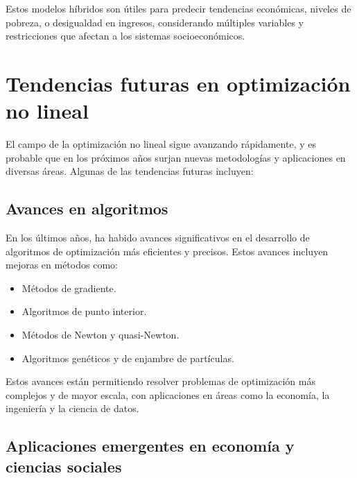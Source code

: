 \begin{flushleft}
	Estos modelos híbridos son útiles para predecir tendencias económicas, niveles de pobreza, o desigualdad en ingresos, considerando múltiples variables y restricciones que afectan a los sistemas socioeconómicos.
\end{flushleft}

\section{Tendencias futuras en optimización no lineal}

\begin{flushleft}
	El campo de la optimización no lineal sigue avanzando rápidamente, y es probable que en los próximos años surjan nuevas metodologías y aplicaciones en diversas áreas. Algunas de las tendencias futuras incluyen:
\end{flushleft}

\subsection{Avances en algoritmos}

\begin{flushleft}
	En los últimos años, ha habido avances significativos en el desarrollo de algoritmos de optimización más eficientes y precisos. Estos avances incluyen mejoras en métodos como:
\end{flushleft}

\begin{itemize}
	\item Métodos de gradiente.
	\item Algoritmos de punto interior.
	\item Métodos de Newton y quasi-Newton.
	\item Algoritmos genéticos y de enjambre de partículas.
\end{itemize}

\begin{flushleft}
	Estos avances están permitiendo resolver problemas de optimización más complejos y de mayor escala, con aplicaciones en áreas como la economía, la ingeniería y la ciencia de datos.
\end{flushleft}

\subsection{Aplicaciones emergentes en economía y ciencias sociales}

